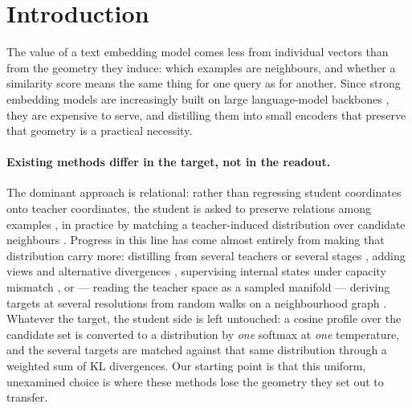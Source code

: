 \section{Introduction}
\label{sec:intro}

The value of a text embedding model comes less from individual vectors than from the
geometry they induce: which examples are neighbours, and whether a similarity score means
the same thing for one query as for another. Since strong embedding models are increasingly
built on large language-model backbones \citep{chen2024bgem3,zhang2025qwen3embedding}, they
are expensive to serve, and distilling them into small encoders that preserve that geometry
is a practical necessity.

\paragraph{Existing methods differ in the target, not in the readout.}
The dominant approach is relational: rather than regressing student coordinates onto teacher
coordinates, the student is asked to preserve relations among examples
\citep{park2019rkd,tung2019sp}, in practice by matching a teacher-induced distribution over
candidate neighbours \citep{fang2021seed,tian2020crd,yang2020lsp}. Progress in this line has
come almost entirely from making that distribution carry more: distilling from several
teachers or several stages \citep{zhang2024jasperstella}, adding views and alternative
divergences \citep{xu2023distillcse,wen2023fdivergence}, supervising internal states under
capacity mismatch \citep{zhang2024dskd,dao2026talas}, or --- reading the teacher space as a
sampled manifold --- deriving targets at several resolutions from random walks on a
neighbourhood graph \citep{coifman2006diffusionmaps,klicpera2019gdc}. Whatever the target,
the student side is left untouched: a cosine profile over the candidate set is converted to
a distribution by \emph{one} softmax at \emph{one} temperature, and the several targets are
matched against that same distribution through a weighted sum of KL divergences. Our
starting point is that this uniform, unexamined choice is where these methods lose the
geometry they set out to transfer.

